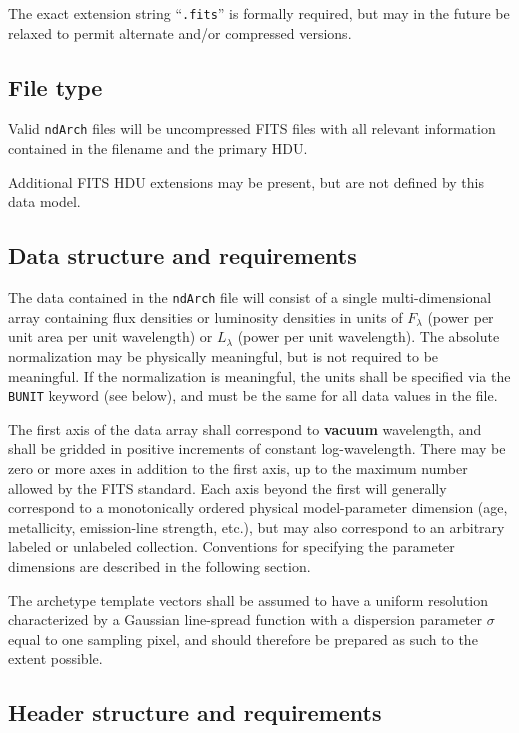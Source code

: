 \documentclass[12pt]{article}
\begin{document}
The exact extension string ``\texttt{.fits}'' is formally required,
but may in the future be relaxed to permit alternate and/or
compressed versions.

\subsection{File type}

Valid \texttt{ndArch} files will be uncompressed FITS
files with all relevant information contained in the
filename and the primary HDU\@.

Additional FITS HDU extensions may be present, but are not defined
by this data model.

\subsection{Data structure and requirements}

The data contained in the \texttt{ndArch} file
will consist of a single multi-dimensional array
containing flux densities or luminosity densities in units of
$F_{\lambda}$ (power per unit area per unit wavelength) or $L_{\lambda}$
(power per unit wavelength).
The absolute normalization may be physically
meaningful, but is not required to be meaningful.
If the normalization is meaningful, the units
shall be specified via the \texttt{BUNIT} keyword (see below),
and must be the same for all data values in the file.

The first axis of the data array shall correspond to \textbf{vacuum}
wavelength, and shall be gridded in positive increments of constant
log-wavelength.  There may be zero or more axes in addition
to the first axis, up to the maximum number allowed by
the FITS standard.  Each axis beyond the first will generally correspond
to a monotonically ordered
physical model-parameter dimension (age, metallicity,
emission-line strength, etc.), but may also correspond to
an arbitrary labeled or unlabeled collection.
Conventions for specifying the parameter dimensions are
described in the following section.

The archetype template vectors shall be assumed to have
a uniform resolution characterized by a Gaussian
line-spread function with a dispersion parameter
$\sigma$ equal to one sampling pixel, and should therefore be
prepared as such to the extent possible.

\subsection{Header structure and requirements}
\end{document}
